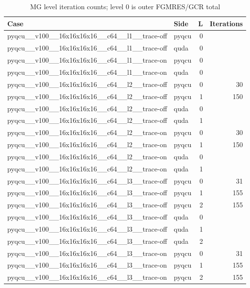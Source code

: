 \begin{table}[htbp]
\centering
\caption{MG level iteration counts; level 0 is outer FGMRES/GCR total}
\small
\begin{tabular}{@{}llrr@{}}
\toprule
Case & Side & L & Iterations \\
\midrule
pyqcu\_\_v100\_\_16x16x16x16\_\_c64\_\_l1\_\_trace-off & pyqcu & 0 &  \\
pyqcu\_\_v100\_\_16x16x16x16\_\_c64\_\_l1\_\_trace-off & quda & 0 &  \\
pyqcu\_\_v100\_\_16x16x16x16\_\_c64\_\_l1\_\_trace-on & pyqcu & 0 &  \\
pyqcu\_\_v100\_\_16x16x16x16\_\_c64\_\_l1\_\_trace-on & quda & 0 &  \\
pyqcu\_\_v100\_\_16x16x16x16\_\_c64\_\_l2\_\_trace-off & pyqcu & 0 & 30 \\
pyqcu\_\_v100\_\_16x16x16x16\_\_c64\_\_l2\_\_trace-off & pyqcu & 1 & 150 \\
pyqcu\_\_v100\_\_16x16x16x16\_\_c64\_\_l2\_\_trace-off & quda & 0 &  \\
pyqcu\_\_v100\_\_16x16x16x16\_\_c64\_\_l2\_\_trace-off & quda & 1 &  \\
pyqcu\_\_v100\_\_16x16x16x16\_\_c64\_\_l2\_\_trace-on & pyqcu & 0 & 30 \\
pyqcu\_\_v100\_\_16x16x16x16\_\_c64\_\_l2\_\_trace-on & pyqcu & 1 & 150 \\
pyqcu\_\_v100\_\_16x16x16x16\_\_c64\_\_l2\_\_trace-on & quda & 0 &  \\
pyqcu\_\_v100\_\_16x16x16x16\_\_c64\_\_l2\_\_trace-on & quda & 1 &  \\
pyqcu\_\_v100\_\_16x16x16x16\_\_c64\_\_l3\_\_trace-off & pyqcu & 0 & 31 \\
pyqcu\_\_v100\_\_16x16x16x16\_\_c64\_\_l3\_\_trace-off & pyqcu & 1 & 155 \\
pyqcu\_\_v100\_\_16x16x16x16\_\_c64\_\_l3\_\_trace-off & pyqcu & 2 & 155 \\
pyqcu\_\_v100\_\_16x16x16x16\_\_c64\_\_l3\_\_trace-off & quda & 0 &  \\
pyqcu\_\_v100\_\_16x16x16x16\_\_c64\_\_l3\_\_trace-off & quda & 1 &  \\
pyqcu\_\_v100\_\_16x16x16x16\_\_c64\_\_l3\_\_trace-off & quda & 2 &  \\
pyqcu\_\_v100\_\_16x16x16x16\_\_c64\_\_l3\_\_trace-on & pyqcu & 0 & 31 \\
pyqcu\_\_v100\_\_16x16x16x16\_\_c64\_\_l3\_\_trace-on & pyqcu & 1 & 155 \\
pyqcu\_\_v100\_\_16x16x16x16\_\_c64\_\_l3\_\_trace-on & pyqcu & 2 & 155 \\

\end{tabular}
\end{table}
